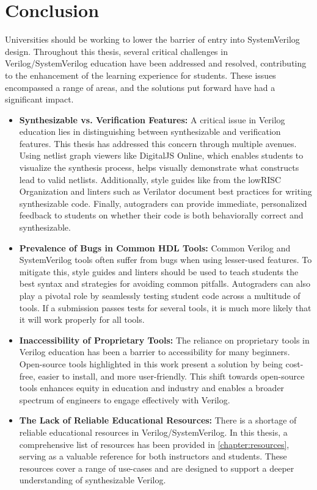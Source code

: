 
\chapter{Conclusion}
\label{chapter:conclusion}

Universities should be working to lower the barrier of entry into SystemVerilog design. Throughout this thesis, several critical challenges in Verilog/SystemVerilog education have been addressed and resolved, contributing to the enhancement of the learning experience for students. These issues encompassed a range of areas, and the solutions put forward have had a significant impact.

\begin{itemize}
    \item \textbf{Synthesizable vs. Verification Features:} A critical issue in Verilog education lies in distinguishing between synthesizable and verification features. This thesis has addressed this concern through multiple avenues. Using netlist graph viewers like DigitalJS Online, which enables students to visualize the synthesis process, helps visually demonstrate what constructs lead to valid netlists. Additionally, style guides like from the lowRISC Organization and linters such as Verilator document best practices for writing synthesizable code. Finally, autograders can provide immediate, personalized feedback to students on whether their code is both behaviorally correct and synthesizable.
    \item \textbf{Prevalence of Bugs in Common HDL Tools:} Common Verilog and SystemVerilog tools often suffer from bugs when using lesser-used features. To mitigate this, style guides and linters should be used to teach students the best syntax and strategies for avoiding common pitfalls. Autograders can also play a pivotal role by seamlessly testing student code across a multitude of tools. If a submission passes tests for several tools, it is much more likely that it will work properly for all tools.
    \item \textbf{Inaccessibility of Proprietary Tools:} The reliance on proprietary tools in Verilog education has been a barrier to accessibility for many beginners. Open-source tools highlighted in this work present a solution by being cost-free, easier to install, and more user-friendly. This shift towards open-source tools enhances equity in education and industry and enables a broader spectrum of engineers to engage effectively with Verilog.
    \item \textbf{The Lack of Reliable Educational Resources:} There is a shortage of reliable educational resources in Verilog/SystemVerilog. In this thesis, a comprehensive list of resources has been provided in \autoref{chapter:resources}, serving as a valuable reference for both instructors and students. These resources cover a range of use-cases and are designed to support a deeper understanding of synthesizable Verilog.

\end{itemize}
